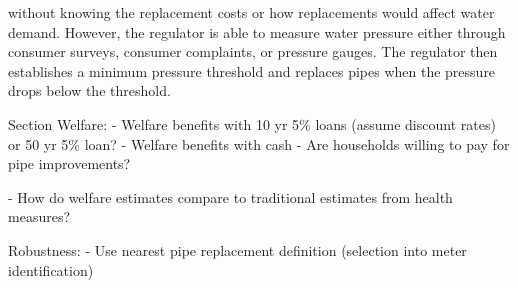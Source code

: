 \documentclass[12pt,table]{article}
\begin{document}
without knowing the replacement costs or how replacements would affect water demand.  However, the regulator is able to measure water pressure either through consumer surveys, consumer complaints, or pressure gauges.  The regulator then establishes a minimum pressure threshold and replaces pipes when the pressure drops below the threshold.


Section Welfare:
	- Welfare benefits with 10 yr 5\% loans (assume discount rates) or 50 yr 5\% loan?
	- Welfare benefits with cash
	- Are households willing to pay for pipe improvements?

	- How do welfare estimates compare to traditional estimates from health measures?

Robustness:
	- Use nearest pipe replacement definition (selection into meter identification)















\end{document}
